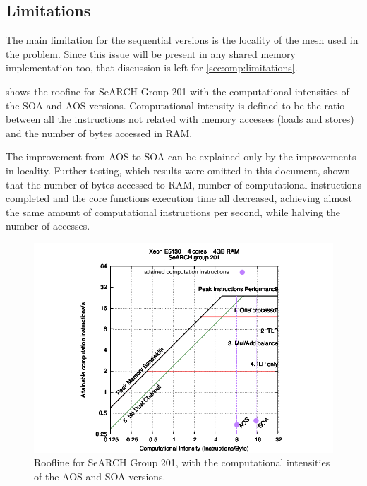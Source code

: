 \subsection{Limitations}
\label{sec:seq:limitations}

The main limitation for the sequential versions is the locality of the mesh used in the problem. Since this issue will be present in any shared memory implementation too, that discussion is left for \cref{sec:omp:limitations}.

 shows the roofine for SeARCH Group 201 with the computational intensities of the SOA and AOS versions. Computational intensity is defined to be the ratio between all the instructions not related with memory accesses (loads and stores) and the number of bytes accessed in RAM.

The improvement from AOS to SOA can be explained only by the improvements in locality. Further testing, which results were omitted in this document, shown that the number of bytes accessed to RAM, number of computational instructions completed and the core functions execution time all decreased, achieving almost the same amount of computational instructions per second, while halving the number of accesses.

\begin{figure}
	\centering
	\includegraphics[width=\columnwidth]{images/roofline201m}
	\caption{Roofline for SeARCH Group 201, with the computational intensities of the AOS and SOA versions.}
	\label{fig:roofline201}
\end{figure}
